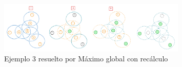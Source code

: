 \begin{figure}[H]
    \centering
    \includegraphics[width=0.8\textwidth]{img/greedy_ej3_mgr.png}
    \caption{Ejemplo 3 resuelto por Máximo global con recálculo}
    \label{fig:greedy_ej3_mgr}
\end{figure}